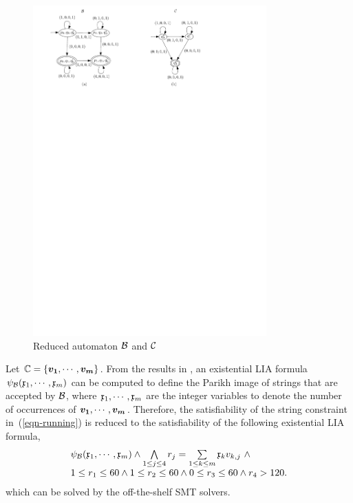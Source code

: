 \begin{figure}[ht]
\vspace{-2mm}
  \centering
  \includegraphics[width = 0.8\textwidth]{sections/overview-cefa-reduced.pdf}
  \caption{Reduced automaton $\mathcal{B}$ and $\mathcal{C}$}
  \label{fig:overview:product:reduced}
\vspace{-4mm}
\end{figure}
%
Let $\costset = \{\myvec{v_1}, \cdots, \myvec{v_m}\}$. 
From the results in \cite{SSMH04,VSS05}, an existential LIA formula $\psi_{\mathcal{B}}(\mathfrak{x}_1, \cdots, \mathfrak{x}_m)$ can be computed to define the Parikh image of strings that are accepted by $\mathcal{B}$, where $\mathfrak{x}_1, \cdots, \mathfrak{x}_m$ are the integer variables to denote the number of occurrences of $\myvec{v_1}, \cdots, \myvec{v_m}$.
Therefore, the satisfiability of the string constraint in~(\ref{eqn-running}) is reduced to the satisfiability of the following existential LIA formula,
\begin{equation}\label{eqn-LIA}
\begin{array}{l}
\psi_{\mathcal{B}}(\mathfrak{x}_1, \cdots, \mathfrak{x}_m) \wedge \bigwedge \limits_{1 \le j \le 4} r_j = \sum \limits_{1\le k \le m}  \mathfrak{x}_k v_{k, j}\ \wedge \\
1 \le r_1 \le 60 \wedge 1 \le r_2 \le 60 \wedge 0 \le r_3 \le 60 \wedge r_4 > 120.
\end{array}
\end{equation}
which can be solved by the off-the-shelf SMT solvers.

